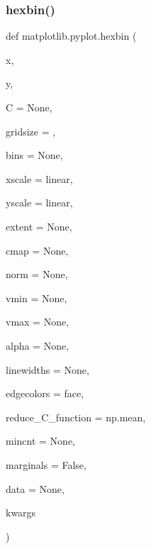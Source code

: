 \subsubsection{\texorpdfstring{hexbin()}{hexbin()}}
{\footnotesize\ttfamily def matplotlib.\+pyplot.\+hexbin (\begin{DoxyParamCaption}\item[{}]{x,  }\item[{}]{y,  }\item[{}]{C = {\ttfamily None},  }\item[{}]{gridsize = {},  }\item[{}]{bins = {\ttfamily None},  }\item[{}]{xscale = {\ttfamily \textquotesingle{}linear\textquotesingle{}},  }\item[{}]{yscale = {\ttfamily \textquotesingle{}linear\textquotesingle{}},  }\item[{}]{extent = {\ttfamily None},  }\item[{}]{cmap = {\ttfamily None},  }\item[{}]{norm = {\ttfamily None},  }\item[{}]{vmin = {\ttfamily None},  }\item[{}]{vmax = {\ttfamily None},  }\item[{}]{alpha = {\ttfamily None},  }\item[{}]{linewidths = {\ttfamily None},  }\item[{}]{edgecolors = {\ttfamily \textquotesingle{}face\textquotesingle{}},  }\item[{}]{reduce\+\_\+\+C\+\_\+function = {\ttfamily np.mean},  }\item[{}]{mincnt = {\ttfamily None},  }\item[{}]{marginals = {\ttfamily False},  }\item[{}]{data = {\ttfamily None},  }\item[{}]{kwargs }\end{DoxyParamCaption})}

\mbox{\label{namespacematplotlib_1_1pyplot_af5293d65a9cf1343949501230e2d161e}} 
